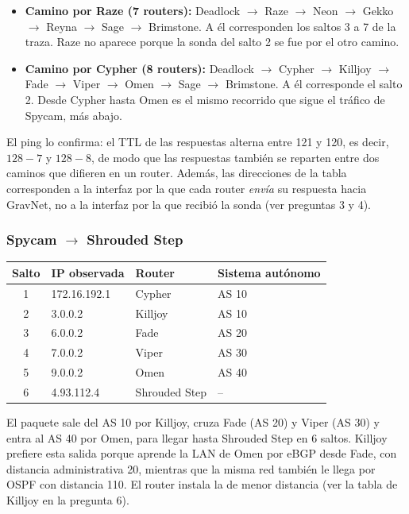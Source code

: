 \begin{itemize}[nosep]
  \item \textbf{Camino por Raze (7 routers):} Deadlock $\rightarrow$ Raze $\rightarrow$ Neon $\rightarrow$ Gekko $\rightarrow$ Reyna $\rightarrow$ Sage $\rightarrow$ Brimstone. A él corresponden los saltos 3 a 7 de la traza. Raze no aparece porque la sonda del salto 2 se fue por el otro camino.
  \item \textbf{Camino por Cypher (8 routers):} Deadlock $\rightarrow$ Cypher $\rightarrow$ Killjoy $\rightarrow$ Fade $\rightarrow$ Viper $\rightarrow$ Omen $\rightarrow$ Sage $\rightarrow$ Brimstone. A él corresponde el salto 2. Desde Cypher hasta Omen es el mismo recorrido que sigue el tráfico de Spycam, más abajo.
\end{itemize}

El ping lo confirma: el TTL de las respuestas alterna entre 121 y 120, es decir, $128-7$ y $128-8$, de modo que las respuestas también se reparten entre dos caminos que difieren en un router. Además, las direcciones de la tabla corresponden a la interfaz por la que cada router \emph{envía} su respuesta hacia GravNet, no a la interfaz por la que recibió la sonda (ver preguntas 3 y 4).

\subsubsection*{Spycam $\rightarrow$ Shrouded Step}

\begin{center}\small
\begin{tabular}{@{}clll@{}}
  \toprule
  Salto & IP observada & Router & Sistema autónomo \\
  \midrule
  1 & 172.16.192.1 & Cypher & AS 10 \\
  2 & 3.0.0.2 & Killjoy & AS 10 \\
  3 & 6.0.0.2 & Fade & AS 20 \\
  4 & 7.0.0.2 & Viper & AS 30 \\
  5 & 9.0.0.2 & Omen & AS 40 \\
  6 & 4.93.112.4 & Shrouded Step & -- \\
  \bottomrule
\end{tabular}
\end{center}

El paquete sale del AS 10 por Killjoy, cruza Fade (AS 20) y Viper (AS 30) y entra al AS 40 por Omen, para llegar hasta Shrouded Step en 6 saltos. Killjoy prefiere esta salida porque
aprende la LAN de Omen por eBGP desde Fade, con distancia administrativa 20, mientras que la misma red también le llega por OSPF con distancia 110. El router instala la de 
menor distancia (ver la tabla de Killjoy en la pregunta 6).